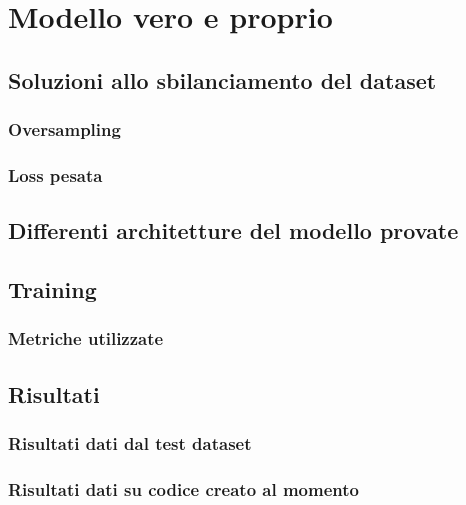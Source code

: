 \chapter{Modello vero e proprio}\label{chap:modello}
\section{Soluzioni allo sbilanciamento del dataset}
    \subsection{Oversampling}
    \subsection{Loss pesata}
\section{Differenti architetture del modello provate}
\section{Training}
\subsection{Metriche utilizzate}

\section{Risultati}
\subsection{Risultati dati dal test dataset}
\subsection{Risultati dati su codice creato al momento}